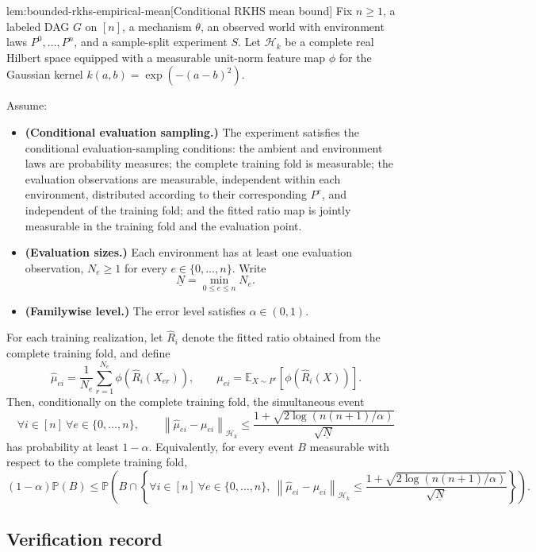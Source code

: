 \begin{lemmav}{lem:bounded-rkhs-empirical-mean}[Conditional RKHS mean bound]
Fix \(n\ge 1\), a labeled DAG \(G\) on \([n]\), a mechanism \(\theta\), an observed world with environment laws \(P^0,\ldots,P^n\), and a sample-split experiment \(S\). Let \(\mathcal H_k\) be a complete real Hilbert space equipped with a measurable unit-norm feature map \(\phi\) for the Gaussian kernel \(k(a,b)=\exp(-(a-b)^2)\).

Assume:
\begin{itemize}
\item \textbf{(Conditional evaluation sampling.)} The experiment satisfies the conditional evaluation-sampling conditions: the ambient and environment laws are probability measures; the complete training fold is measurable; the evaluation observations are measurable, independent within each environment, distributed according to their corresponding \(P^e\), and independent of the training fold; and the fitted ratio map is jointly measurable in the training fold and the evaluation point.
\item \textbf{(Evaluation sizes.)} Each environment has at least one evaluation observation, \(N_e\ge 1\) for every \(e\in\{0,\ldots,n\}\). Write
\[
\underline N=\min_{0\le e\le n}N_e .
\]
\item \textbf{(Familywise level.)} The error level satisfies \(\alpha\in(0,1)\).
\end{itemize}

For each training realization, let \(\widehat R_i\) denote the fitted ratio obtained from the complete training fold, and define
\[
\widehat \mu_{e i}
=
\frac{1}{N_e}\sum_{r=1}^{N_e}\phi\!\left(\widehat R_i(X_{er})\right),
\qquad
\mu_{e i}
=
\mathbb E_{X\sim P^e}\!\left[\phi\!\left(\widehat R_i(X)\right)\right].
\]
Then, conditionally on the complete training fold, the simultaneous event
\[
\forall i\in[n]\ \forall e\in\{0,\ldots,n\},\qquad
\left\|\widehat \mu_{e i}-\mu_{e i}\right\|_{\mathcal H_k}
\le
\frac{1+\sqrt{2\log\!\left(n(n+1)/\alpha\right)}}{\sqrt{\underline N}}
\]
has probability at least \(1-\alpha\). Equivalently, for every event \(B\) measurable with respect to the complete training fold,
\[
(1-\alpha)\mathbb P(B)
\le
\mathbb P\!\left(
B\cap
\left\{
\forall i\in[n]\ \forall e\in\{0,\ldots,n\},\
\left\|\widehat \mu_{e i}-\mu_{e i}\right\|_{\mathcal H_k}
\le
\frac{1+\sqrt{2\log\!\left(n(n+1)/\alpha\right)}}{\sqrt{\underline N}}
\right\}
\right).
\]
\end{lemmav}

\subsection*{Verification record}

